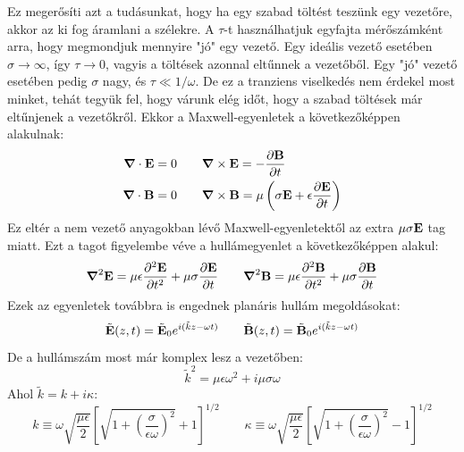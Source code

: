 \documentclass[../main.tex]{subfiles}
\begin{document}
Ez megerősíti azt a tudásunkat, hogy ha egy szabad töltést teszünk egy vezetőre, akkor az ki fog áramlani a szélekre. A $\tau$-t használhatjuk egyfajta mérőszámként arra, hogy
megmondjuk mennyire "jó" egy vezető. Egy ideális vezető esetében $\sigma \to \infty$, így $\tau \to 0$, vagyis a töltések azonnal eltűnnek a vezetőből. Egy "jó" vezető esetében pedig $\sigma$ nagy, és $\tau \ll 1/\omega$.
De ez a tranziens viselkedés nem érdekel most minket, tehát tegyük fel, hogy várunk elég időt, hogy a szabad töltések már eltűnjenek a vezetőkről. Ekkor a Maxwell-egyenletek a következőképpen alakulnak:
\begin{equation}
    \begin{aligned}
        \boldsymbol{\nabla} \cdot \bold{E} &= 0 \qquad \boldsymbol{\nabla} \times \bold{E} = -\frac{\partial \bold{B}}{\partial t} \\
        \boldsymbol{\nabla} \cdot \bold{B} &= 0 \qquad \boldsymbol{\nabla} \times \bold{B} = \mu \left( \sigma \bold{E} + \epsilon \frac{\partial \bold{E}}{\partial t} \right)
    \end{aligned}
\end{equation}
Ez eltér a nem vezető anyagokban lévő Maxwell-egyenletektől az extra $\mu \sigma \bold{E}$ tag miatt. Ezt a tagot figyelembe véve a hullámegyenlet a következőképpen alakul:
\begin{equation}
    \boldsymbol{\nabla}^2 \bold{E} = \mu \epsilon \frac{\partial^2 \bold{E}}{\partial t^2} + \mu \sigma \frac{\partial \bold{E}}{\partial t} \qquad \boldsymbol{\nabla}^2 \bold{B} = \mu \epsilon \frac{\partial^2 \bold{B}}{\partial t^2} + \mu \sigma \frac{\partial \bold{B}}{\partial t}
\end{equation}
Ezek az egyenletek továbbra is engednek planáris hullám megoldásokat:
\begin{equation}
    \tilde{\bold{E}}(z, t) = \tilde{\bold{E}}_0 e^{i(\tilde{k}z - \omega t)} \qquad \tilde{\bold{B}}(z, t) = \tilde{\bold{B}}_0 e^{i(\tilde{k}z - \omega t)}
\end{equation}
De a hullámszám most már komplex lesz a vezetőben:
\begin{equation}
    \tilde{k}^2 = \mu \epsilon \omega^2 + i \mu \sigma \omega
\end{equation}
Ahol $\tilde{k} = k + i \kappa$:
\begin{equation}
    k \equiv \omega \sqrt{\frac{\mu \epsilon}{2}} \left[ \sqrt{1 + \left( \frac{\sigma}{\epsilon \omega} \right)^2} + 1 \right]^{1/2} \qquad \kappa \equiv \omega \sqrt{\frac{\mu \epsilon}{2}} \left[ \sqrt{1 + \left( \frac{\sigma}{\epsilon \omega} \right)^2} - 1 \right]^{1/2}
\end{equation}
\end{document}
